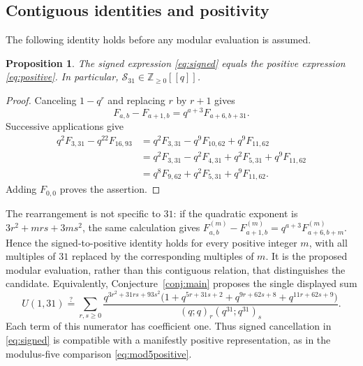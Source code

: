 \documentclass[11pt,reqno]{amsart}
\newcommand{\ZZ}{\mathbb Z}
\newcommand{\Ssum}{\mathcal S_{31}}
\newtheorem{proposition}[theorem]{Proposition}
\theoremstyle{remark}
\numberwithin{equation}{section}
\begin{document}
\subsection{Contiguous identities and positivity}
The following identity holds before any modular evaluation is assumed.
\begin{proposition}\label{prop:positive}
The signed expression \eqref{eq:signed} equals the positive expression
\eqref{eq:positive}. In particular, $\Ssum\in\ZZ_{\geq0}[[q]]$.
\end{proposition}
\begin{proof}
Canceling $1-q^r$ and replacing $r$ by $r+1$ gives
\begin{equation}\label{eq:contig}
 F_{a,b}-F_{a+1,b}=q^{a+3}F_{a+6,b+31}.
\end{equation}
Successive applications give
\[
\begin{aligned}
 q^2F_{3,31}-q^{22}F_{16,93}
 &=q^2F_{3,31}-q^9F_{10,62}+q^9F_{11,62}\\
 &=q^2F_{3,31}-q^2F_{4,31}+q^2F_{5,31}+q^9F_{11,62}\\
 &=q^8F_{9,62}+q^2F_{5,31}+q^9F_{11,62}.
\end{aligned}
\]
Adding $F_{0,0}$ proves the assertion.
\end{proof}
The rearrangement is not specific to $31$: if the quadratic exponent
is $3r^2+mrs+3ms^2$, the same calculation gives
$F^{(m)}_{a,b}-F^{(m)}_{a+1,b}=q^{a+3}F^{(m)}_{a+6,b+m}$.
Hence the signed-to-positive identity holds for every positive integer
$m$, with all multiples of $31$ replaced by the corresponding
multiples of $m$. It is the proposed modular evaluation, rather than
this contiguous relation, that distinguishes the candidate.
Equivalently, Conjecture~\ref{conj:main} proposes the single displayed sum
\begin{equation}\label{eq:positive-numerator}
 U(1,31)\stackrel?=
 \sum_{r,s\geq0}\frac{q^{3r^2+31rs+93s^2}
 \bigl(1+q^{5r+31s+2}+q^{9r+62s+8}+q^{11r+62s+9}\bigr)}
 {(q;q)_r(q^{31};q^{31})_s}.
\end{equation}
Each term of this numerator has coefficient one. Thus signed
cancellation in \eqref{eq:signed} is compatible with a manifestly
positive representation, as in the modulus-five comparison
\eqref{eq:mod5positive}.
\end{document}
